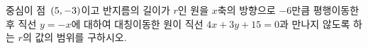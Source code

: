 중심이 점~$(5{,}\mkern3mu\mathopen{}-3)$이고 반지름의 길이가 $r$인 원을 $x$축의 방향으로 $-6$만큼 평행이동한 후 직선 $y=-x$에 대하여 대칭이동한 원이 직선 $4x+3y+15=0$과 만나지 않도록 하는 $r$의 값의 범위를 구하시오.
